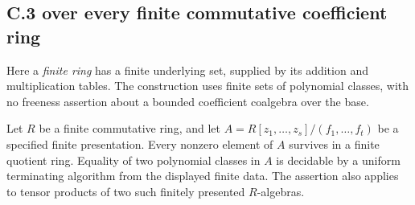\subsection{C.3 over every finite commutative coefficient ring}
\label{C:finite-bases-subsection}

Here a \emph{finite ring} has a finite underlying set, supplied
by its addition and multiplication tables. The construction uses finite
sets of polynomial classes, with no freeness assertion about a bounded
coefficient coalgebra over the base.

\begin{lemma}
\label{C:finite-base-polynomial-equality}
Let $R$ be a finite commutative ring, and let
$A=R[z_1,\ldots,z_s]/(f_1,\ldots,f_t)$ be a specified finite presentation.
Every nonzero element of $A$ survives in a finite quotient ring.
Equality of two polynomial classes in $A$ is decidable by a uniform
terminating algorithm from the displayed finite data. The assertion
also applies to tensor products of two such finitely presented
$R$-algebras.
\end{lemma}

